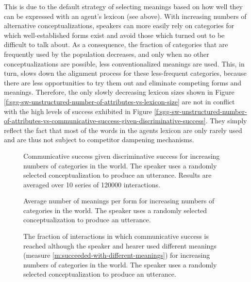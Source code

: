 This is due to the default strategy of selecting meanings based on how
well they can be expressed with an agent's lexicon (see above). With
increasing numbers of alternative conceptualizations, speakers can
more easily rely on categories for which well-established forms exist
and avoid those which turned out to be difficult to talk about. As a
consequence, the fraction of categories that are frequently used by
the population decreases, and only when no other conceptualizations
are possible, less conventionalized meanings are used. This, in turn,
slows down the alignment process for these less-frequent categories,
because there are less opportunities to try them out and eliminate
competing forms and meanings. Therefore, the only slowly decreasing
lexicon sizes shown in Figure
\ref{f:sgg-sw-unstructured-number-of-attributes-vs-lexicon-size} are
not in conflict with the high levels of success exhibited in Figure
\ref{f:sgg-sw-unstructured-number-of-attributes-vs-communicative-success-given-discriminative-success}. They
simply reflect the fact that most of the words in the agents lexicon
are only rarely used and are thus not subject to competitor dampening
mechanisms.\\


\startfiguregroup

\begin{figure}[t]
  \caption{Communi\-cative success given discriminative success for
    increasing numbers of categories in the world. The speaker uses
    a randomly selected conceptualization to produce an
    utterance. Results are averaged over 10 series of 120000
    interactions.}
  \label{f:sgg-sw-unstructured-speaker-process-one-meaning-number-of-attributes-vs-communicative-success-given-discriminative-success}
\end{figure}


\begin{figure}[t]
  \caption{Average number of meanings per form for increasing
    numbers of categories in the world. The speaker uses a randomly
    selected conceptualization to produce an utterance. }
  \label{f:sgg-sw-unstructured-speaker-process-one-meaning-number-of-attributes-vs-homonymy}
  \end{figure}


\begin{figure}[t]
  \caption{The fraction of interactions in which communicative success
    is reached although the speaker and hearer used different meanings
    (measure \ref{m:succeeded-with-different-meanings}) for increasing
    numbers of categories in the world. The speaker uses a randomly
    selected conceptualization to produce an utterance. }
  \label{f:sgg-sw-unstructured-speaker-process-one-meaning-number-of-attributes-vs-succeeded-with-different-meanings}
\end{figure}

